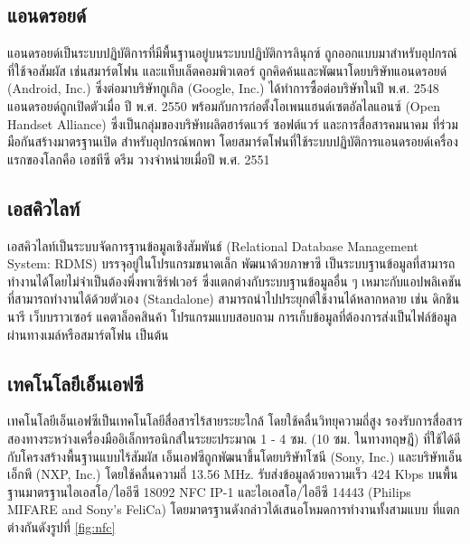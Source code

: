 \documentclass[12pt,a4paper,twocolumn]{article}
\begin{document}
\subsection{แอนดรอยด์}
แอนดรอยด์เป็นระบบปฏิบัติการที่มีพื้นฐานอยู่บนระบบปฏิบัติการลินุกซ์ ถูกออกแบบมาสำหรับอุปกรณ์ที่ใช้จอสัมผัส เช่นสมาร์ตโฟน และแท็บเล็ตคอมพิวเตอร์ ถูกคิดค้นและพัฒนาโดยบริษัทแอนดรอยด์ (Android, Inc.) ซึ่งต่อมาบริษัทกูเกิล (Google, Inc.) ได้ทำการซื้อต่อบริษัทในปี พ.ศ. 2548 แอนดรอยด์ถูกเปิดตัวเมื่อ ปี พ.ศ. 2550 พร้อมกับการก่อตั้งโอเพนแฮนด์เซตอัลไลแอนซ์ (Open Handset Alliance) ซึ่งเป็นกลุ่มของบริษัทผลิตฮาร์ดแวร์ ซอฟต์แวร์ และการสื่อสารคมนาคม ที่ร่วมมือกันสร้างมาตรฐานเปิด สำหรับอุปกรณ์พกพา โดยสมาร์ตโฟนที่ใช้ระบบปฏิบัติการแอนดรอยด์เครื่องแรกของโลกคือ เอชทีซี ดรีม วางจำหน่ายเมื่อปี พ.ศ. 2551

\subsection{เอสคิวไลท์}
เอสคิวไลท์เป็นระบบจัดการฐานข้อมูลเชิงสัมพันธ์ (Relational Database Management System: RDMS) บรรจุอยู่ในโปรแกรมขนาดเล็ก พัฒนาด้วยภาษาซี เป็นระบบฐานข้อมูลที่สามารถทำงานได้โดยไม่จำเป็นต้องพึ่งพาเซิร์ฟเวอร์ ซึ่งแตกต่างกับระบบฐานข้อมูลอื่น ๆ เหมาะกับแอปพลิเคชันที่สามารถทำงานได้ด้วยตัวเอง (Standalone) สามารถนำไปประยุกต์ใช้งานได้หลากหลาย เช่น ดิกชินนารี เว็บบราวเซอร์ แคตาล็อคสินค้า โปรแกรมแบบสอบถาม การเก็บข้อมูลที่ต้องการส่งเป็นไฟล์ข้อมูลผ่านทางเมล์หรือสมาร์ตโฟน เป็นต้น

\subsection{เทคโนโลยีเอ็นเอฟซี}
เทคโนโลยีเอ็นเอฟซีเป็นเทคโนโลยีสื่อสารไร้สายระยะใกล้ โดยใช้คลื่นวิทยุความถี่สูง รองรับการสื่อสารสองทางระหว่างเครื่องมืออิเล็กทรอนิกส์ในระยะประมาณ 1 - 4 ซม. (10 ซม. ในทางทฤษฎี) ที่ใช้ได้ดีกับโครงสร้างพื้นฐานแบบไร้สัมผัส เอ็นเอฟซีถูกพัฒนาขึ้นโดยบริษัทโซนี (Sony, Inc.) และบริษัทเอ็นเอ็กพี (NXP, Inc.) โดยใช้คลื่นความถี่ 13.56 MHz. รับส่งข้อมูลด้วยความเร็ว 424 Kbps บนพื้นฐานมาตรฐานไอเอสโอ/ไออีซี 18092 NFC IP-1 \cite{itm:prp-rfid} และไอเอสโอ/ไออีซี 14443 \cite{itm:cicc} (Philips MIFARE and Sony’s FeliCa) โดยมาตรฐานดังกล่าวได้เสนอโหมดการทำงานทั้งสามแบบ \cite{itm:IDA-Pay} ที่แตกต่างกันดังรูปที่ \ref{fig:nfc}
\end{document}
